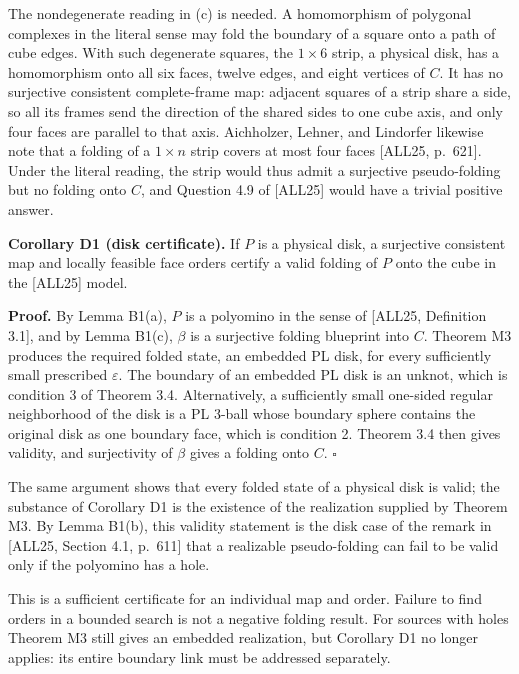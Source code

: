 \documentclass[
  11pt,
]{article}
\begin{document}
The nondegenerate reading in (c) is needed. A homomorphism of polygonal
complexes in the literal sense may fold the boundary of a square onto a
path of cube edges. With such degenerate squares, the \(1\times6\)
strip, a physical disk, has a homomorphism onto all six faces, twelve
edges, and eight vertices of \(C\). It has no surjective consistent
complete-frame map: adjacent squares of a strip share a side, so all its
frames send the direction of the shared sides to one cube axis, and only
four faces are parallel to that axis. Aichholzer, Lehner, and Lindorfer
likewise note that a folding of a \(1\times n\) strip covers at most
four faces {[}ALL25, p.~621{]}. Under the literal reading, the strip
would thus admit a surjective pseudo-folding but no folding onto \(C\),
and Question 4.9 of {[}ALL25{]} would have a trivial positive answer.

\textbf{Corollary D1 (disk certificate).} If \(P\) is a physical disk, a
surjective consistent map and locally feasible face orders certify a
valid folding of \(P\) onto the cube in the {[}ALL25{]} model.

\textbf{Proof.} By Lemma B1(a), \(P\) is a polyomino in the sense of
{[}ALL25, Definition 3.1{]}, and by Lemma B1(c), \(\beta\) is a
surjective folding blueprint into \(C\). Theorem M3 produces the
required folded state, an embedded PL disk, for every sufficiently small
prescribed \(\varepsilon\). The boundary of an embedded PL disk is an
unknot, which is condition 3 of Theorem 3.4. Alternatively, a
sufficiently small one-sided regular neighborhood of the disk is a PL
3-ball whose boundary sphere contains the original disk as one boundary
face, which is condition 2. Theorem 3.4 then gives validity, and
surjectivity of \(\beta\) gives a folding onto \(C\). \(\square\)

The same argument shows that every folded state of a physical disk is
valid; the substance of Corollary D1 is the existence of the realization
supplied by Theorem M3. By Lemma B1(b), this validity statement is the
disk case of the remark in {[}ALL25, Section 4.1, p.~611{]} that a
realizable pseudo-folding can fail to be valid only if the polyomino has
a hole.

This is a sufficient certificate for an individual map and order.
Failure to find orders in a bounded search is not a negative folding
result. For sources with holes Theorem M3 still gives an embedded
realization, but Corollary D1 no longer applies: its entire boundary
link must be addressed separately.
\end{document}

